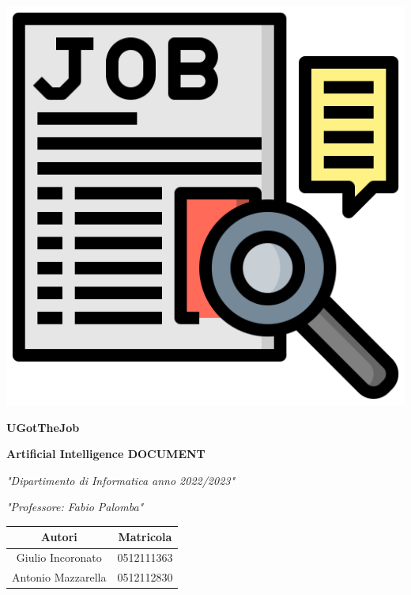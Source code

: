 \documentclass[12pt]{article}
\author{Giulio Incoronato, Antonio Mazzarella}
\newcommand{\mainname}{UGotTheJob}
\begin{document}
\thispagestyle{empty}

\begin{center}%
    \includegraphics[scale=0.6]{job_seeking.png}

    \vspace{1cm}

    \textbf{\huge{\mainname}} %

    \vspace{0.5cm}

    \fontsize{17}{16}
    \textbf{Artificial Intelligence DOCUMENT}

    \textit{"Dipartimento di Informatica anno 2022/2023"}

    \textit{"Professore: Fabio Palomba"}

    \vspace{1.8cm}


    \begin{table}[ht]
        \fontsize{17}{12}\selectfont
        \centering
        \setlength{\arrayrulewidth}{2pt}
        \setlength{\tabcolsep}{5pt}
        \def\arraystretch{1.8}
        \begin{tabular}{ c | c }
            \textbf{Autori}    & \textbf{Matricola} \\
            \hline
            Giulio Incoronato  & 0512111363         \\
            Antonio Mazzarella & 0512112830         \\
        \end{tabular}
    \end{table}
\end{center}
\end{document}
